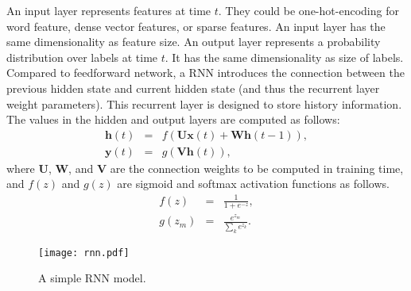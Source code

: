 \documentclass[11pt,a4paper]{article}
\begin{document}
An input layer represents features at time $t$. They could be one-hot-encoding for word feature, dense vector features, or sparse features. An input layer has the same dimensionality as feature size. An output layer represents a probability distribution over labels at time $t$. It has the same dimensionality as size of labels. Compared to feedforward network, a RNN introduces the connection between the previous hidden state and current hidden state (and thus the recurrent layer weight parameters).  This recurrent layer is designed to store history information. The values in the hidden and output layers are computed as follows:
\begin{eqnarray}
\textbf{h} (t) &=& f(\textbf{U}\textbf{x}(t) + \textbf{W}\textbf{h}(t-1)), \label{eq:01} \\
\textbf{y} (t) &=& g(\textbf{V}\textbf{h}(t)), \label{eq:12-2}
\end{eqnarray}
where $\textbf{U}$, $\textbf{W}$, and $\textbf{V}$ are the connection weights to be computed in training time, and 
$f(z)$ and $g(z)$ are sigmoid and softmax activation functions as follows.
\begin{eqnarray}
f(z) &=& \frac{1}{1+e^{-z}}, \\
g(z_m) &=& \frac{e^{z_m}}{\sum_k e^{z_k}}. \label{eq:softmax}
\end{eqnarray}

\begin{figure}[htb]
	\centering
		\texttt{[image: rnn.pdf]}
	\caption{A simple RNN model.}
	\label{fig:rnn}
\end{figure} 
\end{document}
